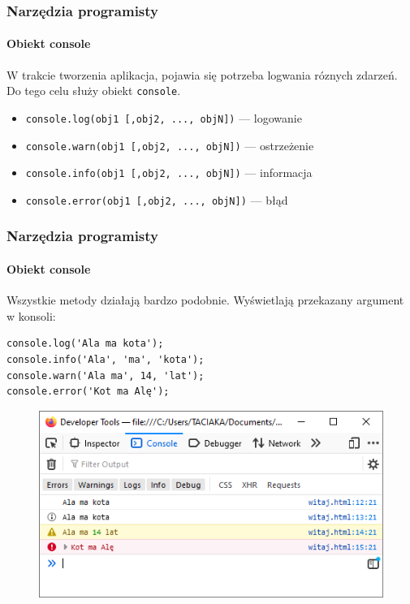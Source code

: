 \begin{frame}[fragile]
  \frametitle{Narzędzia programisty}
  \framesubtitle{Obiekt console}

  W trakcie tworzenia aplikacja, pojawia się potrzeba logwania róznych zdarzeń. Do tego celu służy obiekt \verb|console|.

  {\footnotesize
    \begin{itemize}
      \item \verb|console.log(obj1 [,obj2, ..., objN])| --- logowanie
      \item \verb|console.warn(obj1 [,obj2, ..., objN])| --- ostrzeżenie
      \item \verb|console.info(obj1 [,obj2, ..., objN])| --- informacja
      \item \verb|console.error(obj1 [,obj2, ..., objN])| --- błąd
    \end{itemize}
  }
\end{frame}


\begin{frame}[fragile]
  \frametitle{Narzędzia programisty}
  \framesubtitle{Obiekt console}

  Wszystkie metody działają bardzo podobnie. Wyświetlają przekazany argument w konsoli:

  \begin{verbatim}
console.log('Ala ma kota');
console.info('Ala', 'ma', 'kota');
console.warn('Ala ma', 14, 'lat');
console.error('Kot ma Alę');
  \end{verbatim}

  \begin{figure}
    \includegraphics[scale=0.45]{images/dev-tools-console-example}
  \end{figure}


\end{frame}



